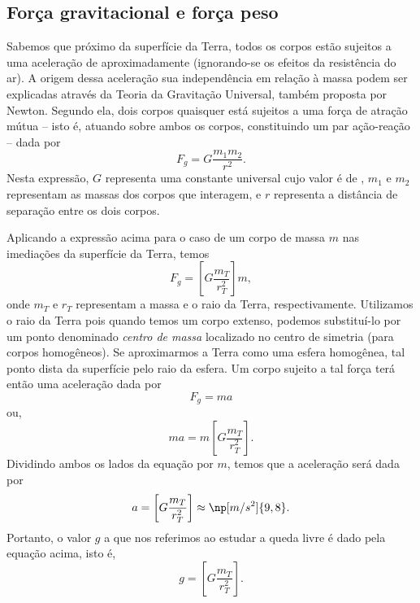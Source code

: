 \subsection{Força gravitacional e força peso} 

Sabemos que próximo da superfície da Terra, todos os corpos estão sujeitos a uma aceleração de aproximadamente  (ignorando-se os efeitos da resistência do ar). A origem dessa aceleração sua independência em relação à massa podem ser explicadas através da Teoria da Gravitação Universal, também proposta por Newton. Segundo ela, dois corpos quaisquer está sujeitos a uma força de atração mútua -- isto é, atuando sobre ambos os corpos, constituindo um par ação-reação -- dada por
\begin{equation}\label{Eq:LeiGravitacaoUniversal}
  F_g = G \frac{m_1 m_2}{r^2}.
\end{equation}
%
Nesta expressão, $G$ representa uma constante universal cujo valor é de , $m_1$ e $m_2$ representam as massas dos corpos que interagem, e $r$ representa a distância de separação entre os dois corpos.

Aplicando a expressão acima para o caso de um corpo de massa $m$ nas imediações da superfície da Terra, temos
\begin{equation}
  F_g = \left[G \frac{m_T}{r_T^2}\right]m,
\end{equation}
%
onde $m_T$ e $r_T$ representam a massa e o raio da Terra, respectivamente. Utilizamos o raio da Terra pois quando temos um corpo extenso, podemos substituí-lo por um ponto denominado \emph{centro de massa} localizado no centro de simetria (para corpos homogêneos). Se aproximarmos a Terra como uma esfera homogênea, tal ponto dista da superfície pelo raio da esfera. Um corpo sujeito a tal força terá então uma aceleração dada por
\begin{equation}
  F_g = ma
\end{equation}
%
ou,
\begin{equation}\label{Eq:EliminaM}
  ma = m \left[G \frac{m_T}{r_T^2}\right].
\end{equation}
%
Dividindo ambos os lados da equação por $m$, temos que a aceleração será dada por
\begin{equation}
  a = \left[G \frac{m_T}{r_T^2}\right] \approx \np[m/s^2]{9,8}.
\end{equation}
%
Portanto, o valor $g$ a que nos referimos ao estudar a queda livre é dado pela equação acima, isto é,
\begin{equation}
  g = \left[G \frac{m_T}{r_T^2}\right].
\end{equation}

